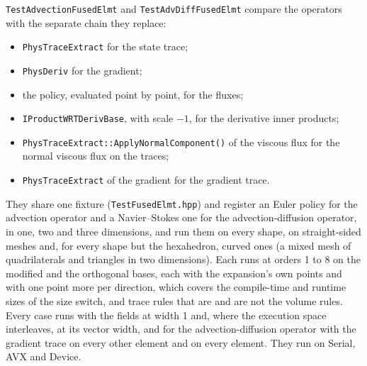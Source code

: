 \texttt{TestAdvectionFusedElmt} and \texttt{TestAdvDiffFusedElmt} compare
the operators with the separate chain they replace:
\begin{itemize}
  \item \texttt{PhysTraceExtract} for the state trace;
  \item \texttt{PhysDeriv} for the gradient;
  \item the policy, evaluated point by point, for the fluxes;
  \item \texttt{IProductWRTDerivBase}, with scale $-1$, for the derivative
    inner products;
  \item \texttt{PhysTraceExtract::ApplyNormalComponent()} of the viscous
    flux for the normal viscous flux on the traces;
  \item \texttt{PhysTraceExtract} of the gradient for the gradient trace.
\end{itemize}
They share one fixture (\texttt{TestFusedElmt.hpp}) and register an Euler
policy for the advection operator and a Navier--Stokes one for the
advection-diffusion operator, in one, two and three dimensions, and run them
on every shape, on straight-sided meshes and, for every shape but the
hexahedron, curved ones (a mixed mesh of quadrilaterals and triangles in two
dimensions). Each runs at orders 1 to 8 on the modified and the orthogonal
bases, each with the expansion's own points and with one point more per
direction, which covers the compile-time and runtime sizes of the size
switch, and trace rules that are and are not the volume rules. Every case
runs with the fields at width 1 and, where the execution space interleaves,
at its vector width, and for the advection-diffusion operator with the
gradient trace on every other element and on every element. They run on
Serial, AVX and Device.
